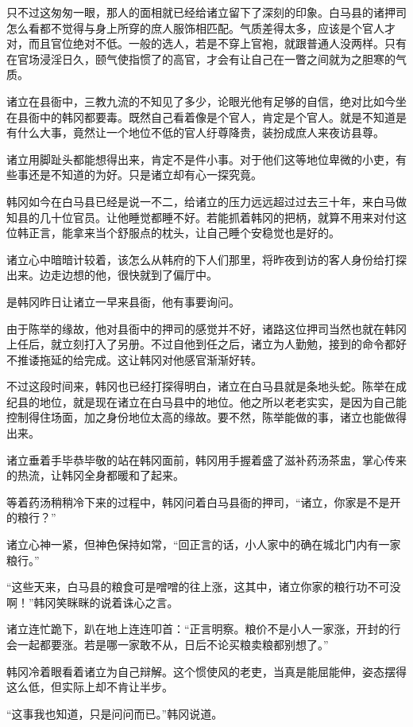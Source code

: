 只不过这匆匆一眼，那人的面相就已经给诸立留下了深刻的印象。白马县的诸押司怎么看都不觉得与身上所穿的庶人服饰相匹配。气质差得太多，应该是个官人才对，而且官位绝对不低。一般的选人，若是不穿上官袍，就跟普通人没两样。只有在官场浸淫日久，颐气使指惯了的高官，才会有让自己在一瞥之间就为之胆寒的气质。

诸立在县衙中，三教九流的不知见了多少，论眼光他有足够的自信，绝对比如今坐在县衙中的韩冈都要毒。既然自己看着像是个官人，肯定是个官人。就是不知道是有什么大事，竟然让一个地位不低的官人纡尊降贵，装扮成庶人来夜访县尊。

诸立用脚趾头都能想得出来，肯定不是件小事。对于他们这等地位卑微的小吏，有些事还是不知道的为好。只是诸立却有心一探究竟。

韩冈如今在白马县已经是说一不二，给诸立的压力远远超过过去三十年，来白马做知县的几十位官员。让他睡觉都睡不好。若能抓着韩冈的把柄，就算不用来对付这位韩正言，能拿来当个舒服点的枕头，让自己睡个安稳觉也是好的。

诸立心中暗暗计较着，该怎么从韩府的下人们那里，将昨夜到访的客人身份给打探出来。边走边想的他，很快就到了偏厅中。

是韩冈昨日让诸立一早来县衙，他有事要询问。

由于陈举的缘故，他对县衙中的押司的感觉并不好，诸路这位押司当然也就在韩冈上任后，就立刻打入了另册。不过自他到任之后，诸立为人勤勉，接到的命令都好不推诿拖延的给完成。这让韩冈对他感官渐渐好转。

不过这段时间来，韩冈也已经打探得明白，诸立在白马县就是条地头蛇。陈举在成纪县的地位，就是现在诸立在白马县中的地位。他之所以老老实实，是因为自己能控制得住场面，加之身份地位太高的缘故。要不然，陈举能做的事，诸立也能做得出来。

诸立垂着手毕恭毕敬的站在韩冈面前，韩冈用手握着盛了滋补药汤茶盅，掌心传来的热流，让韩冈全身都暖和了起来。

等着药汤稍稍冷下来的过程中，韩冈问着白马县衙的押司，“诸立，你家是不是开的粮行？”

诸立心神一紧，但神色保持如常，“回正言的话，小人家中的确在城北门内有一家粮行。”

“这些天来，白马县的粮食可是噌噌的往上涨，这其中，诸立你家的粮行功不可没啊！”韩冈笑眯眯的说着诛心之言。

诸立连忙跪下，趴在地上连连叩首：“正言明察。粮价不是小人一家涨，开封的行会一起都要涨。若是哪一家敢不从，日后不论买粮卖粮都别想了。”

韩冈冷着眼看着诸立为自己辩解。这个惯使风的老吏，当真是能屈能伸，姿态摆得这么低，但实际上却不肯让半步。

“这事我也知道，只是问问而已。”韩冈说道。

